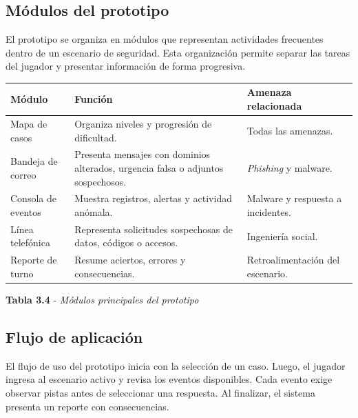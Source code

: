 \subsection{M\'{o}dulos del prototipo}

El prototipo se organiza en m\'{o}dulos que representan actividades frecuentes dentro de un escenario de seguridad. Esta organizaci\'{o}n permite separar las tareas del jugador y presentar informaci\'{o}n de forma progresiva.

\begin{center}

\vspace{0.2cm}
\begin{tabular}{|p{}|p{}|p{}|}
\hline
\textbf{M\'{o}dulo} & \textbf{Funci\'{o}n} & \textbf{Amenaza relacionada} \\
\hline
Mapa de casos & Organiza niveles y progresi\'{o}n de dificultad. & Todas las amenazas. \\
\hline
Bandeja de correo & Presenta mensajes con dominios alterados, urgencia falsa o adjuntos sospechosos. & \textit{Phishing} y malware. \\
\hline
Consola de eventos & Muestra registros, alertas y actividad an\'{o}mala. & Malware y respuesta a incidentes. \\
\hline
L\'{i}nea telef\'{o}nica & Representa solicitudes sospechosas de datos, c\'{o}digos o accesos. & Ingenier\'{i}a social. \\
\hline
Reporte de turno & Resume aciertos, errores y consecuencias. & Retroalimentaci\'{o}n del escenario. \\
\hline
\end{tabular}

\textbf{Tabla 3.4} - \textit{M\'{o}dulos principales del prototipo}

\end{center}

\subsection{Flujo de aplicaci\'{o}n}

El flujo de uso del prototipo inicia con la selecci\'{o}n de un caso. Luego, el jugador ingresa al escenario activo y revisa los eventos disponibles. Cada evento exige observar pistas antes de seleccionar una respuesta. Al finalizar, el sistema presenta un reporte con consecuencias.

